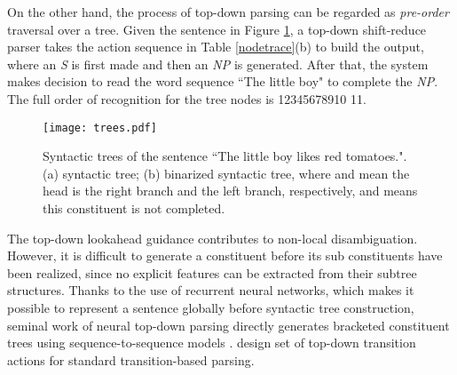 \documentclass[11pt,letterpaper]{article}
\begin{document}
On the other hand, the process of top-down parsing can be regarded as \textit{pre-order} traversal over a tree.
Given the sentence in Figure \ref{trees}, a top-down shift-reduce parser takes the action sequence in Table \ref{nodetrace}(b) to build the output, where an \textit{S} is first made and then an \textit{NP} is generated.
After that, the system makes decision to read the word sequence ``The little boy" to complete the \textit{NP}.
The full order of recognition for the tree nodes is \textcircled{\scriptsize{1}}\textcircled{\scriptsize{2}}\textcircled{\scriptsize{3}}\textcircled{\scriptsize{4}}\textcircled{\scriptsize{5}}\textcircled{\scriptsize{6}}\textcircled{\scriptsize{7}}\textcircled{\scriptsize{8}}\textcircled{\scriptsize{9}}\textcircled{\scriptsize{10}} \textcircled{\scriptsize{11}}.
\begin{figure}
\begin{center}
\texttt{[image: trees.pdf]}
\end{center}
\caption{\label{trees} Syntactic trees of the sentence ``The little boy likes red tomatoes.". (a) syntactic tree; (b) binarized syntactic tree, where  and  mean the head is the right branch and the left branch, respectively, and  means this constituent is not completed.}
\end{figure}
The top-down lookahead guidance contributes to non-local disambiguation.
However, it is difficult to generate a constituent before its sub constituents have been realized, since no explicit features can be extracted from their subtree structures.
Thanks to the use of recurrent neural networks, which makes it possible to represent a sentence globally before syntactic tree construction, seminal work of neural top-down parsing directly generates bracketed constituent trees using sequence-to-sequence models \cite{vinyals:2015}.
 design set of top-down transition actions for standard transition-based parsing.
\end{document}
